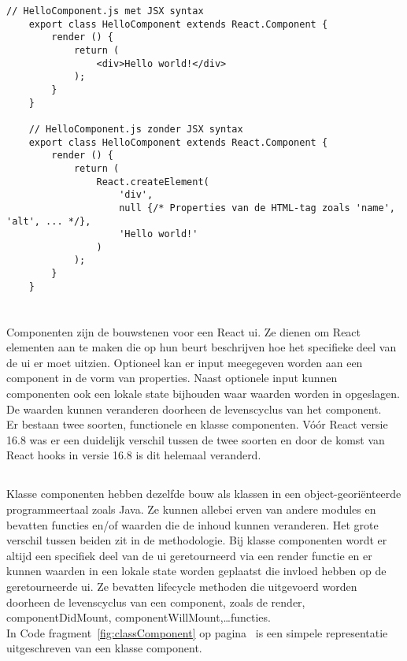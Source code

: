 \begin{lstlisting}[caption=JSX naar gewone javaScript, label={fig:translatedJSX}]
    // HelloComponent.js met JSX syntax
    export class HelloComponent extends React.Component {
        render () {
            return (
                <div>Hello world!</div>
            );
        }
    }
    
    // HelloComponent.js zonder JSX syntax
    export class HelloComponent extends React.Component {
        render () {
            return (
                React.createElement(
                    'div',
                    null {/* Properties van de HTML-tag zoals 'name', 'alt', ... */},
                    'Hello world!'
                )
            );
        }
    }
\end{lstlisting}

\section{}
\label{sec:componenten}

Componenten zijn de bouwstenen voor een React \gls{ui}. Ze dienen om React elementen aan te maken die op hun beurt beschrijven hoe het specifieke deel van de \gls{ui} er moet uitzien. Optioneel kan er input meegegeven worden aan een component in de vorm van properties. Naast optionele input kunnen componenten ook een lokale state bijhouden waar waarden worden in opgeslagen. De waarden kunnen veranderen doorheen de levenscyclus van het component.\\
Er bestaan twee soorten, functionele en klasse componenten. Vóór React versie 16.8 was er een duidelijk verschil tussen de twee soorten en door de komst van React hooks in versie 16.8 is dit helemaal veranderd.

\subsection{}
\label{sec:klasseComp}

Klasse componenten hebben dezelfde bouw als klassen in een object-georiënteerde programmeertaal zoals Java. Ze kunnen allebei erven van andere modules en bevatten functies en/of waarden die de inhoud kunnen veranderen. Het grote verschil tussen beiden zit in de methodologie. Bij klasse componenten wordt er altijd een specifiek deel van de \gls{ui} geretourneerd via een render functie en er kunnen waarden in een lokale state worden geplaatst die invloed hebben op de geretourneerde \gls{ui}. Ze bevatten lifecycle methoden die uitgevoerd worden doorheen de levenscyclus van een component, zoals de render, componentDidMount, componentWillMount,\dots functies.\\
In Code fragment~\ref{fig:classComponent} op pagina~\pageref{fig:classComponent} is een simpele representatie uitgeschreven van een klasse component.

